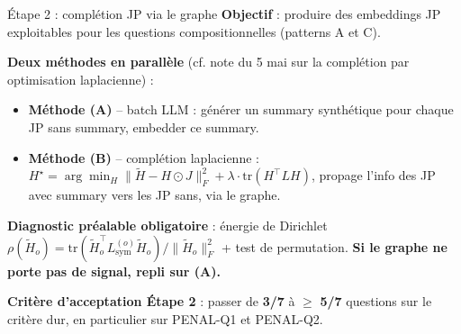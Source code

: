 \documentclass[aspectratio=169,10pt]{beamer}
\newcommand{\keybox}[1]{%
  \begin{center}
  \colorbox{accentsoft}{\parbox{0.92\linewidth}{\centering #1}}
  \end{center}}
\begin{document}
\begin{frame}{Étape 2 : complétion JP via le graphe}
  \small
  \textbf{Objectif} : produire des embeddings JP exploitables pour les questions
  compositionnelles (patterns A et C).

  \vspace{0.4em}
  \textbf{Deux méthodes en parallèle} (cf. note du 5 mai sur la complétion par
  optimisation laplacienne) :
  \begin{itemize}\setlength\itemsep{0.3em}
    \item \textbf{Méthode (A)} -- batch LLM : générer un summary synthétique pour
    chaque JP sans summary, embedder ce summary.
    \item \textbf{Méthode (B)} -- complétion laplacienne :
    $H^\star = \arg\min_H \lVert \widetilde{H} - H \odot J \rVert_F^2 + \lambda \cdot \mathrm{tr}(H^\top L H)$,
    propage l'info des JP avec summary vers les JP sans, via le graphe.
  \end{itemize}

  \vspace{0.4em}
  \textbf{Diagnostic préalable obligatoire} : énergie de Dirichlet
  $\rho(\widetilde{H}_o) = \mathrm{tr}(\widetilde{H}_o^\top L_{\mathrm{sym}}^{(o)} \widetilde{H}_o) / \lVert \widetilde{H}_o \rVert_F^2$
  + test de permutation. \textbf{Si le graphe ne porte pas de signal, repli sur (A).}

  \vspace{0.4em}
  \keybox{\textbf{Critère d'acceptation Étape 2} : passer de \textbf{3/7} à
  $\geq$ \textbf{5/7} questions sur le critère dur, en particulier sur PENAL-Q1 et
  PENAL-Q2.}
\end{frame}
\end{document}
